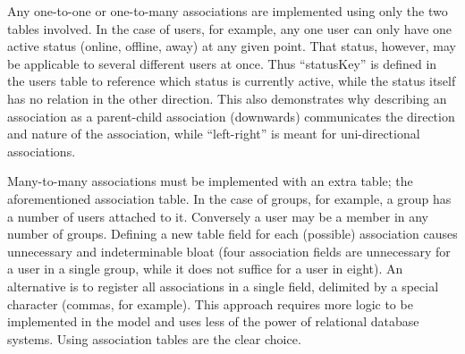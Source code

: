 Any one-to-one or one-to-many associations are implemented using only the two tables involved. In the case of users, for example, any one user can only have one active status (online, offline, away) at any given point. That status, however, may be applicable to several different users at once. Thus ``statusKey'' is defined in the users table to reference which status is currently active, while the status itself has no relation in the other direction. This also demonstrates why describing an association as a parent-child association (downwards) communicates the direction and nature of the association, while ``left-right'' is meant for uni-directional associations.

Many-to-many associations must be implemented with an extra table; the aforementioned association table. In the case of groups, for example, a group has a number of users attached to it. Conversely a user may be a member in any number of groups. Defining a new table field for each (possible) association causes unnecessary and indeterminable bloat (four association fields are unnecessary for a user in a single group, while it does not suffice for a user in eight). An alternative is to register all associations in a single field, delimited by a special character (commas, for example). This approach requires more logic to be implemented in the model and uses less of the power of relational database systems. Using association tables are the clear choice.